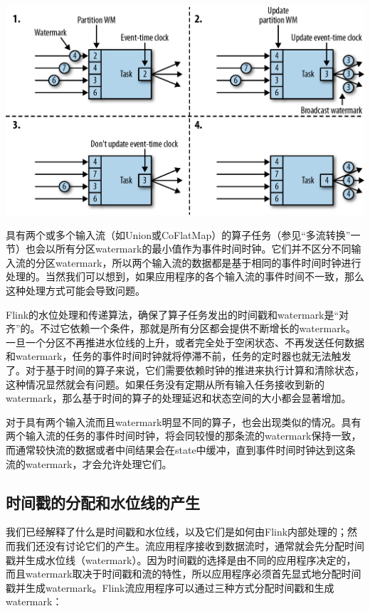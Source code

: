 \documentclass[oneside]{ctexbook}
\begin{document}
\noindent \includegraphics[width=\textwidth]{spaf_0309.png}

具有两个或多个输入流（如Union或CoFlatMap）的算子任务（参见“多流转换”一节）也会以所有分区watermark的最小值作为事件时间时钟。它们并不区分不同输入流的分区watermark，所以两个输入流的数据都是基于相同的事件时间时钟进行处理的。当然我们可以想到，如果应用程序的各个输入流的事件时间不一致，那么这种处理方式可能会导致问题。

Flink的水位处理和传递算法，确保了算子任务发出的时间戳和watermark是“对齐”的。不过它依赖一个条件，那就是所有分区都会提供不断增长的watermark。一旦一个分区不再推进水位线的上升，或者完全处于空闲状态、不再发送任何数据和watermark，任务的事件时间时钟就将停滞不前，任务的定时器也就无法触发了。对于基于时间的算子来说，它们需要依赖时钟的推进来执行计算和清除状态，这种情况显然就会有问题。如果任务没有定期从所有输入任务接收到新的watermark，那么基于时间的算子的处理延迟和状态空间的大小都会显著增加。

对于具有两个输入流而且watermark明显不同的算子，也会出现类似的情况。具有两个输入流的任务的事件时间时钟，将会同较慢的那条流的watermark保持一致，而通常较快流的数据或者中间结果会在state中缓冲，直到事件时间时钟达到这条流的watermark，才会允许处理它们。

\subsection{时间戳的分配和水位线的产生}

我们已经解释了什么是时间戳和水位线，以及它们是如何由Flink内部处理的；然而我们还没有讨论它们的产生。流应用程序接收到数据流时，通常就会先分配时间戳并生成水位线（watermark）。因为时间戳的选择是由不同的应用程序决定的，而且watermark取决于时间戳和流的特性，所以应用程序必须首先显式地分配时间戳并生成watermark。Flink流应用程序可以通过三种方式分配时间戳和生成watermark：
\end{document}
